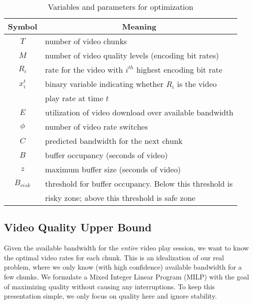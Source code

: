 \begin{table} [bt]
\small
\begin{tabular} {|c |l |}
\hline
\textbf{Symbol}&\multicolumn{1}{c|}{\textbf{Meaning} }\\ \hline
$T$ &number of video chunks  \\ \hline
$M$ &number of video quality levels (encoding bit rates)\\ \hline
$R_i$& rate for the video with $i^{th}$ highest encoding bit rate \\ \hline
$x_i^t$& binary variable indicating whether $R_i$ is the video \\
& play rate at time $t$ \\ \hline
$E$& utilization of video download over available bandwidth \\ \hline
$\phi$ &number of video rate switches \\ \hline
$C $ & predicted bandwidth for the next chunk\\ \hline
$B $ & buffer occupancy (seconds of video) \\ \hline
$z $ &maximum buffer size (seconds of video) \\ \hline
$B_{risk} $ & threshold for buffer occupancy. Below this threshold is\\
& risky zone; above this threshold is safe zone \\ \hline
\end{tabular}
\centering
\caption{Variables and parameters for optimization}
\label{tab:notation}
\end{table}
\subsection{Video Quality Upper Bound}\label{subsec:offline}


Given the available bandwidth for the \emph{entire} video play
session, we want to know the optimal video rates for each chunk. This
is an idealization of our real problem, where we only know (with high
confidence) available bandwidth for a few chunks.
We formulate a Mixed Integer Linear Program (MILP) with the goal of
maximizing quality without causing any interruptions. To keep this
presentation simple, we only focus on quality here and ignore stability. 

